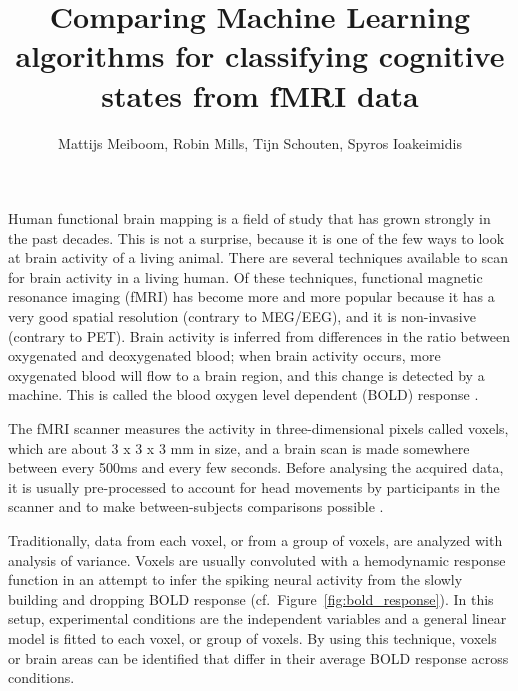 \documentclass[preprint,journal,11pt]{vgtc}
\title{Comparing Machine Learning algorithms for classifying cognitive states from fMRI data}
\author{Mattijs Meiboom, Robin Mills, Tijn Schouten, Spyros Ioakeimidis}
\begin{document}
\label{sec:introduction}

\maketitle

Human functional brain mapping is a field of study that has grown strongly in the past decades. This is not a surprise, because it is one of the few ways to look at brain activity of a living animal. There are several techniques available to scan for brain activity in a living human. Of these techniques, functional magnetic resonance imaging (fMRI) has become more and more popular because it has a very good spatial resolution (contrary to MEG/EEG), and it is non-invasive (contrary to PET). Brain activity is inferred from differences in the ratio between oxygenated and deoxygenated blood; when brain activity occurs, more oxygenated blood will flow to a brain region, and this change is detected by a machine. This is called the blood oxygen level dependent (BOLD) response \cite{sm:2012fMRI}.

The fMRI scanner measures the activity in three-dimensional pixels called voxels, which are about 3 x 3 x 3 mm in size, and a brain scan is made somewhere between every 500ms and every few seconds. Before analysing the acquired data, it is usually pre-processed to account for head movements by participants in the scanner and to make between-subjects comparisons possible \cite{sl:2009rl}.

Traditionally, data from each voxel, or from a group of voxels, are analyzed with analysis of variance. Voxels are usually convoluted with a hemodynamic response function in an attempt to infer the spiking neural activity from the slowly building and dropping BOLD response \cite{he:2002na} (cf.~Figure~\ref{fig:bold_response}). In this setup, experimental conditions are the independent variables and a general linear model is fitted to each voxel, or group of voxels. By using this technique, voxels or brain areas can be identified that differ in their average BOLD response across conditions.
\end{document}
